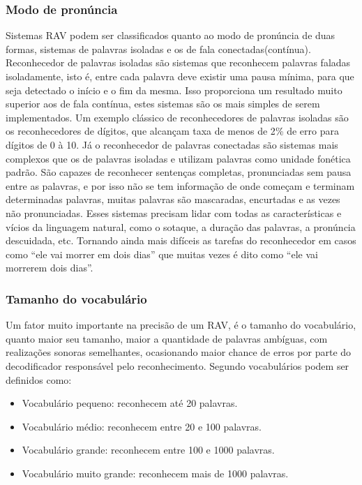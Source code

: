 \subsubsection{Modo de pronúncia}
Sistemas RAV podem ser classificados quanto ao modo de pronúncia de duas formas, sistemas de palavras isoladas e os de fala conectadas(contínua). Reconhecedor de palavras isoladas são sistemas que reconhecem palavras faladas isoladamente, isto é, entre cada palavra deve existir uma pausa mínima, para que seja detectado o início e o fim da mesma. Isso proporciona um resultado muito superior aos de fala contínua, estes sistemas são os mais simples de serem implementados. Um exemplo clássico de reconhecedores de palavras isoladas são os reconhecedores de dígitos, que alcançam taxa de menos de 2{\%} de erro para dígitos de 0 à 10.\cite{RavPtBr}
Já o reconhecedor de palavras conectadas são sistemas mais complexos que os de palavras isoladas e utilizam palavras como unidade fonética padrão. São capazes de reconhecer sentenças completas, pronunciadas sem pausa entre as palavras, e por isso não se tem informação de onde começam 
e terminam determinadas palavras, muitas palavras são mascaradas, encurtadas e as vezes não 
pronunciadas. Esses sistemas precisam lidar com todas as características e vícios da linguagem natural, como o sotaque, a duração das palavras, a pronúncia descuidada, etc. Tornando ainda mais difíceis as tarefas do reconhecedor em casos como “ele vai morrer em dois dias” que 
muitas vezes  é dito como “ele vai morrerem dois dias”.\cite{RavPtBr}

\subsubsection{Tamanho do vocabulário}
Um fator muito importante na precisão de um RAV, é o tamanho do vocabulário, quanto maior seu tamanho, maior a quantidade de palavras ambíguas, com realizações sonoras semelhantes, ocasionando maior chance de erros por parte do decodificador responsável pelo reconhecimento.\cite{RavPtBr} Segundo \cite{RavIsoladas} vocabulários podem ser definidos como:

\begin{itemize}
\item Vocabulário pequeno: reconhecem até 20 palavras. 
\item Vocabulário médio: reconhecem entre 20 e 100 palavras. 
\item Vocabulário grande: reconhecem entre 100 e 1000 palavras. 
\item Vocabulário muito grande: reconhecem mais de 1000 palavras. 
\end{itemize}

